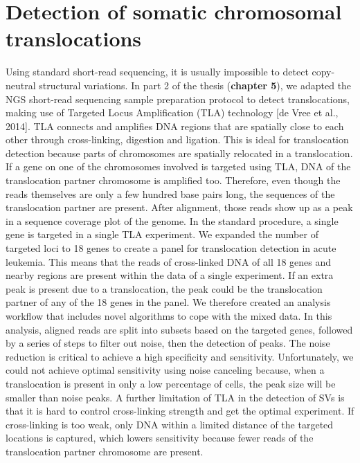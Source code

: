 \section{Detection of somatic chromosomal translocations} \label{Somatic}
Using standard short-read sequencing, it is usually impossible to detect copy-neutral structural variations. 
In part 2 of the thesis (\textbf{chapter 5}), we adapted the NGS short-read sequencing sample preparation protocol to detect translocations, making use of Targeted Locus Amplification (TLA) technology [de Vree et al., 2014]. 
TLA connects and amplifies DNA regions that are spatially close to each other through cross-linking, digestion and ligation. 
This is ideal for translocation detection because parts of chromosomes are spatially relocated in a translocation. 
If a gene on one of the chromosomes involved is targeted using TLA, DNA of the translocation partner chromosome is amplified too. 
Therefore, even though the reads themselves are only a few hundred base pairs long, the sequences of the translocation partner are present. 
After alignment, those reads show up as a peak in a sequence coverage plot of the genome. 
In the standard procedure, a single gene is targeted in a single TLA experiment. 
We expanded the number of targeted loci to 18 genes to create a panel for translocation detection in acute leukemia. 
This means that the reads of cross-linked DNA of all 18 genes and nearby regions are present within the data of a single experiment. 
If an extra peak is present due to a translocation, the peak could be the translocation partner of any of the 18 genes in the panel. 
We therefore created an analysis workflow that includes novel algorithms to cope with the mixed data. In this analysis, aligned reads are split into subsets based on the targeted genes, followed by a series of steps to filter out noise, then the detection of peaks. 
The noise reduction is critical to achieve a high specificity and sensitivity. Unfortunately, we could not achieve optimal sensitivity using noise canceling because, when a translocation is present in only a low percentage of cells, the peak size will be smaller than noise peaks. 
A further limitation of TLA in the detection of SVs is that it is hard to control cross-linking strength and get the optimal experiment. 
If cross-linking is too weak, only DNA within a limited distance of the targeted locations is captured, which lowers sensitivity because fewer reads of the translocation partner chromosome are present. 
